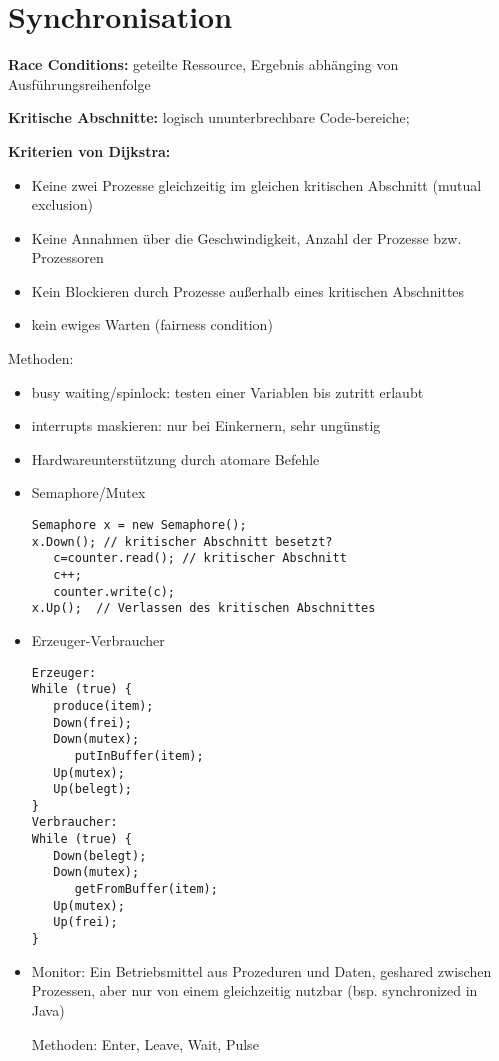 \section*{Synchronisation}
\textbf{Race Conditions:} geteilte Ressource, Ergebnis abhänging von Ausführungsreihenfolge

\textbf{Kritische Abschnitte:} logisch ununterbrechbare Code-bereiche;

\textbf{Kriterien von Dijkstra: }
\begin{itemize}
\item  Keine zwei Prozesse gleichzeitig im gleichen kritischen Abschnitt (mutual exclusion)
\item  Keine Annahmen über die Geschwindigkeit, Anzahl der Prozesse bzw. Prozessoren
\item  Kein Blockieren durch Prozesse außerhalb eines kritischen Abschnittes
\item kein ewiges Warten (fairness condition)
\end{itemize}


Methoden:
\begin{itemize}
\item busy waiting/spinlock: testen einer Variablen bis zutritt erlaubt
\item interrupts maskieren: nur bei Einkernern, sehr ungünstig
\item Hardwareunterstützung durch atomare Befehle
\item Semaphore/Mutex
\begin{verbatim}
Semaphore x = new Semaphore();
x.Down(); // kritischer Abschnitt besetzt?
   c=counter.read(); // kritischer Abschnitt
   c++;
   counter.write(c);
x.Up();  // Verlassen des kritischen Abschnittes
\end{verbatim}

\item Erzeuger-Verbraucher
\begin{multicols}{2}
\begin{verbatim}
Erzeuger:
While (true) {
   produce(item);
   Down(frei);
   Down(mutex);
      putInBuffer(item);
   Up(mutex);
   Up(belegt);
}
Verbraucher:
While (true) {
   Down(belegt);
   Down(mutex);
      getFromBuffer(item);
   Up(mutex);
   Up(frei);
}
\end{verbatim}
\end{multicols}

\item Monitor: Ein Betriebsmittel aus Prozeduren und Daten, geshared zwischen Prozessen, aber nur von einem gleichzeitig nutzbar (bsp. synchronized in Java)

Methoden: Enter, Leave, Wait, Pulse

\end{itemize}
